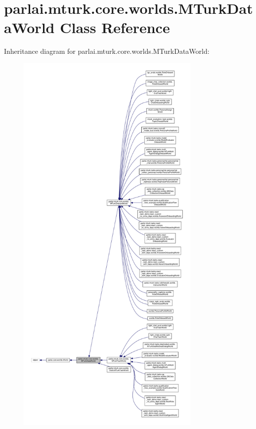 \hypertarget{classparlai_1_1mturk_1_1core_1_1worlds_1_1MTurkDataWorld}{}\section{parlai.\+mturk.\+core.\+worlds.\+M\+Turk\+Data\+World Class Reference}
\label{classparlai_1_1mturk_1_1core_1_1worlds_1_1MTurkDataWorld}


Inheritance diagram for parlai.\+mturk.\+core.\+worlds.\+M\+Turk\+Data\+World\+:
\nopagebreak
\begin{figure}[H]
\begin{center}
\leavevmode
\includegraphics[height=550pt]{classparlai_1_1mturk_1_1core_1_1worlds_1_1MTurkDataWorld__inherit__graph}
\end{center}
\end{figure}


